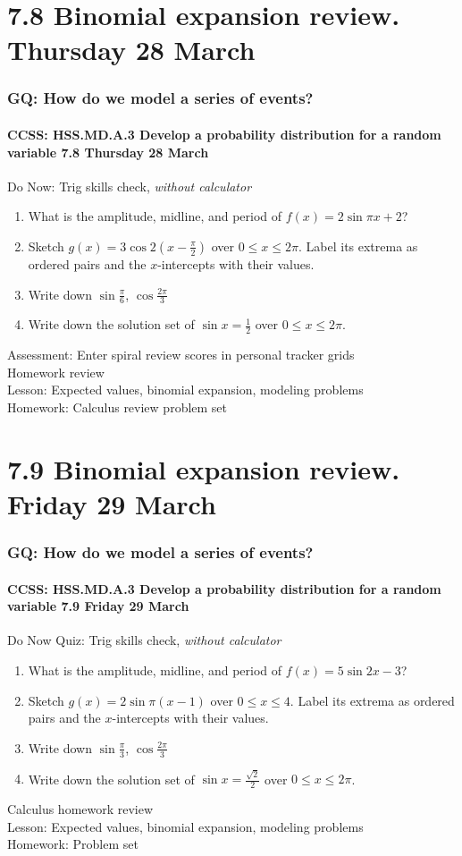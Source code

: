 \documentclass{beamer}
\begin{document}
\section{7.8 Binomial expansion review. Thursday 28 March}
  \frame
  {
    \frametitle{GQ: How do we model a series of events?}
    \framesubtitle{CCSS: HSS.MD.A.3 Develop a probability distribution for a random variable \hfill \alert{7.8 Thursday 28 March}}

    \begin{block}{Do Now: Trig skills check, \emph{without calculator}}
    \begin{enumerate}
        \item What is the amplitude, midline, and period of $f(x)=2\sin \pi x+2$?
        \item Sketch $g(x)=3\cos 2(x- \frac{\pi}{2})$ over $0 \leq x \leq 2 \pi$. Label its extrema as ordered pairs and the $x$-intercepts with their values.
        \item Write down $\sin \frac{\pi}{6}$, $\cos \frac{2\pi}{3}$
        \item Write down the solution set of $\sin x = \frac{1}{2}$ over $0 \leq x \leq 2 \pi$.
    \end{enumerate}
    \end{block}
    Assessment: Enter spiral review scores in personal tracker grids\\
    Homework review\\
    Lesson: Expected values, binomial expansion, modeling problems\\
    Homework: Calculus review problem set
  }

\section{7.9 Binomial expansion review. Friday 29 March}
  \frame
  {
    \frametitle{GQ: How do we model a series of events?}
    \framesubtitle{CCSS: HSS.MD.A.3 Develop a probability distribution for a random variable \hfill \alert{7.9 Friday 29 March}}

    \begin{block}{Do Now Quiz: Trig skills check, \emph{without calculator}}
    \begin{enumerate}
      \item What is the amplitude, midline, and period of $f(x)=5\sin 2 x-3$?
      \item Sketch $g(x)=2\sin \pi(x- 1)$ over $0 \leq x \leq 4$. Label its extrema as ordered pairs and the $x$-intercepts with their values.
      \item Write down $\sin \frac{\pi}{3}$, $\cos \frac{2\pi}{3}$
      \item Write down the solution set of $\sin x = \frac{\sqrt{2}}{2}$ over $0 \leq x \leq 2 \pi$.
    \end{enumerate}
    \end{block}
    Calculus homework review\\
    Lesson: Expected values, binomial expansion, modeling problems\\
    Homework: Problem set
  }
\end{document}
